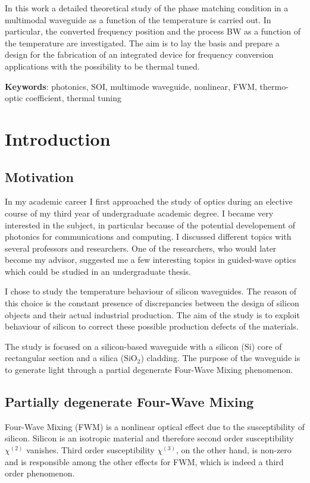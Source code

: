 \documentclass[12pt,a4paper,twoside]{article}
\begin{document}
In this work a detailed theoretical study of the phase matching condition in a multimodal waveguide as a function of the temperature is carried out.
In particular, the converted frequency position and the process BW as a function of the temperature are investigated.
The aim is to lay the basis and prepare a design for the fabrication of an integrated device for frequency conversion applications with the possibility to be thermal tuned.

\vspace{20pt}
\noindent\textbf{Keywords}: photonics, SOI, multimode waveguide, nonlinear, FWM, thermo-optic coefficient, thermal tuning

\cleardoublepage 
\tableofcontents

\cleardoublepage
{}

\section{Introduction}
\subsection{Motivation}
In my academic career I first approached the study of optics during an elective course of my third year of undergraduate academic degree.
I became very interested in the subject, in particular because of the potential developement of photonics for communications and computing.
I discussed different topics with several professors and researchers.
One of the researchers, who would later become my advisor, suggested me a few interesting topics in guided-wave optics which could be studied in an undergraduate thesis.

I chose to study the temperature behaviour of silicon waveguides.
The reason of this choice is the constant presence of discrepancies between the design of silicon objects and their actual industrial production.
The aim of the study is to exploit behaviour of silicon to correct these possible production defects of the materials.

The study is focused on a silicon-based waveguide with a silicon ($\mathrm{Si}$) core of rectangular section and a silica ($\mathrm{SiO}_2$) cladding.
The purpose of the waveguide is to generate light through a partial degenerate Four-Wave Mixing phenomenon.

\subsection{Partially degenerate Four-Wave Mixing}
Four-Wave Mixing (FWM) is a nonlinear optical effect due to the susceptibility of silicon.
Silicon is an isotropic material and therefore second order susceptibility $\chi^{(2)}$ vanishes.
Third order susceptibility $\chi^{(3)}$, on the other hand, is non-zero and is responsible among the other effects for FWM, which is indeed a third order phenomenon.
\end{document}
